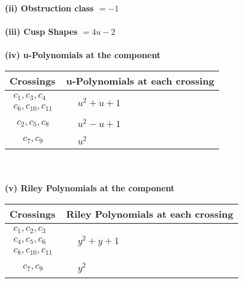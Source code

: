 \documentclass[1p]{elsarticle_modified}
\theoremstyle{definition}
\begin{document}
\flushleft \textbf{(ii) Obstruction class $= -1$}\\~\\
\flushleft \textbf{(iii) Cusp Shapes $= 4 u-2$}\\~\\
\newpage\renewcommand{\arraystretch}{1}
\flushleft \textbf{(iv) u-Polynomials at the component}\newline \\
\begin{tabular}{m{50pt}|m{274pt}}
Crossings & \hspace{64pt}u-Polynomials at each crossing \\
\hline $$\begin{aligned}c_{1},c_{3},c_{4}\\c_{6},c_{10},c_{11}\end{aligned}$$&$\begin{aligned}
&u^2+u+1
\end{aligned}$\\
\hline $$\begin{aligned}c_{2},c_{5},c_{8}\end{aligned}$$&$\begin{aligned}
&u^2- u+1
\end{aligned}$\\
\hline $$\begin{aligned}c_{7},c_{9}\end{aligned}$$&$\begin{aligned}
&u^2
\end{aligned}$\\
\hline
\end{tabular}\\~\\
\newpage\renewcommand{\arraystretch}{1}
\flushleft \textbf{(v) Riley Polynomials at the component}\newline \\
\begin{tabular}{m{50pt}|m{274pt}}
Crossings & \hspace{64pt}Riley Polynomials at each crossing \\
\hline $$\begin{aligned}c_{1},c_{2},c_{3}\\c_{4},c_{5},c_{6}\\c_{8},c_{10},c_{11}\end{aligned}$$&$\begin{aligned}
&y^2+y+1
\end{aligned}$\\
\hline $$\begin{aligned}c_{7},c_{9}\end{aligned}$$&$\begin{aligned}
&y^2
\end{aligned}$\\
\hline
\end{tabular}\\~\\
\end{document}
